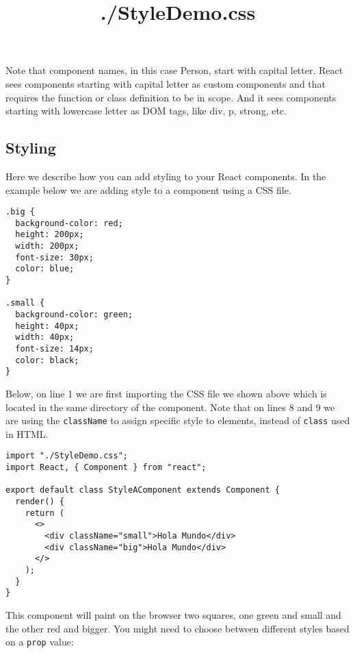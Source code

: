 \documentclass[a4paper, oneside, titlepage, 12pt]{book}
\begin{document}
Note that component names, in this case Person, start with capital letter. React sees components starting with capital letter as custom components and that requires the function or class definition to be in scope. And it sees components starting with lowercase letter as DOM tags, like div, p, strong, etc.

\subsection{Styling}

Here we describe how you can add styling to your React components. In the example below we are adding style to a component using a CSS file.

\begin{listing}[H]
\title{./StyleDemo.css}
\begin{verbatim}
.big {
  background-color: red;
  height: 200px;
  width: 200px;
  font-size: 30px;
  color: blue;
}

.small {
  background-color: green;
  height: 40px;
  width: 40px;
  font-size: 14px;
  color: black;
}
\end{verbatim}
\end{listing}

Below, on line 1 we are first importing the CSS file we shown above which is located in the same directory of the component. Note that on lines 8 and 9 we are using the \texttt{className} to assign specific style to elements, instead of \texttt{class} used in HTML.

\begin{verbatim}
import "./StyleDemo.css";
import React, { Component } from "react";

export default class StyleAComponent extends Component {
  render() {
    return (
      <>
        <div className="small">Hola Mundo</div>
        <div className="big">Hola Mundo</div>
      </>
    );
  }
}
\end{verbatim}

This component will paint on the browser two squares, one green and small and the other red and bigger. You might need to choose between different styles based on a \texttt{prop} value:
\end{document}

